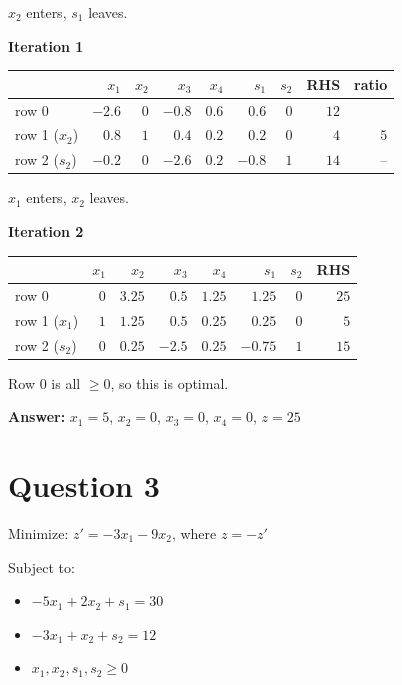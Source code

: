 \documentclass{article}
\begin{document}
$x_2$ enters, $s_1$ leaves.

\textbf{Iteration 1}

\begin{center}
\begin{tabular}{lrrrrrrrr}
\toprule
 & $x_1$ & $x_2$ & $x_3$ & $x_4$ & $s_1$ & $s_2$ & RHS & ratio \\
\midrule
row 0 & $-2.6$ & $0$ & $-0.8$ & $0.6$ & $0.6$ & $0$ & $12$ &  \\
row 1 ($x_2$) & $\boxed{0.8}$ & $1$ & $0.4$ & $0.2$ & $0.2$ & $0$ & $4$ & $5$ \\
row 2 ($s_2$) & $-0.2$ & $0$ & $-2.6$ & $0.2$ & $-0.8$ & $1$ & $14$ & -- \\
\bottomrule
\end{tabular}
\end{center}

$x_1$ enters, $x_2$ leaves.

\textbf{Iteration 2}

\begin{center}
\begin{tabular}{lrrrrrrr}
\toprule
 & $x_1$ & $x_2$ & $x_3$ & $x_4$ & $s_1$ & $s_2$ & RHS \\
\midrule
row 0 & $0$ & $3.25$ & $0.5$ & $1.25$ & $1.25$ & $0$ & $25$ \\
row 1 ($x_1$) & $1$ & $1.25$ & $0.5$ & $0.25$ & $0.25$ & $0$ & $5$ \\
row 2 ($s_2$) & $0$ & $0.25$ & $-2.5$ & $0.25$ & $-0.75$ & $1$ & $15$ \\
\bottomrule
\end{tabular}
\end{center}

Row 0 is all $\ge 0$, so this is optimal.

\textbf{Answer:} $x_1 = 5$, $x_2 = 0$, $x_3 = 0$, $x_4 = 0$, $z = 25$

\section*{Question 3}
Minimize: $z' = -3x_1 - 9x_2$, where $z = -z'$

Subject to:
\begin{itemize}
    \item $-5x_1 + 2x_2 + s_1 = 30$
    \item $-3x_1 + x_2 + s_2 = 12$
    \item $x_1, x_2, s_1, s_2 \ge 0$
\end{itemize}
\end{document}
